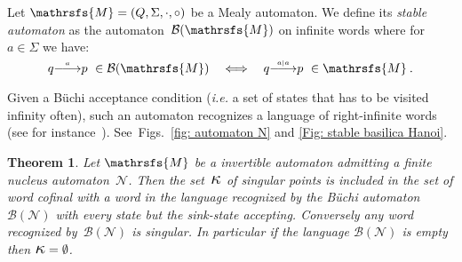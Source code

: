 \documentclass{amsart}
\newtheorem{theorem}{Theorem}[section]
\begin{document}
Let ${{{\mathrsfs{{M}}}}}=({{{Q}}},{{{\Sigma}}},{{{\cdot}}}, {{{\circ}}})$ be a Mealy automaton.
We define its \emph{stable automaton} as the automaton~${\mathcal{B}({{{\mathrsfs{{M}}}}})}$ on infinite words where for~$a\in {{{\Sigma}}}$ we have:
\[ q{\smash{\stackrel{\text{\tiny{${a}$}}}{\relbar\joinrel\longrightarrow}}} p\ \in {\mathcal{B}({{{\mathrsfs{{M}}}}})}\quad\Longleftrightarrow\quad
q{\smash{\stackrel{\text{\tiny{${a|a}$}}}{\relbar\joinrel\longrightarrow}}}p\  \in {{{\mathrsfs{{M}}}}}\:.\]

Given a B\"uchi acceptance condition (\emph{i.e.} a set of states that has to be visited infinity often), such an automaton recognizes a language of right-infinite words (see for instance~\cite{Buchi}). See~Figs.~\ref{fig: automaton N} and \ref{Fig: stable basilica Hanoi}.

\begin{theorem}\label{prop:singular_lang}
Let ${{{\mathrsfs{{M}}}}}$ be a invertible automaton admitting a finite nucleus automaton~$\mathcal{N}$. Then the set~${\hbox{\Large{$\kappa$}}}$ of singular points is included in the set of word cofinal with a word in the language recognized by the  B\"uchi automaton ${\mathcal{B}({\mathcal{N}})}$ with every state but the sink-state accepting. Conversely any word recognized by~${\mathcal{B}({\mathcal{N}})}$ is singular. In particular if the language ${\mathcal{B}({\mathcal{N}})}$ is empty then ${\hbox{\Large{$\kappa$}}} = \emptyset$.
\end{theorem}
\end{document}

